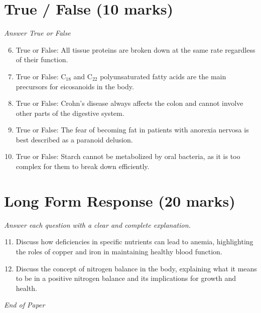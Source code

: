 \documentclass[12pt]{article}
\begin{document}
\section*{True / False (10 marks)}
\textit{Answer True or False}
\begin{enumerate}[label=\arabic*.]
\setcounter{enumi}{5}
\item True or False: All tissue proteins are broken down at the same rate regardless of their function.
\item True or False: C$_{18}$ and C$_{22}$ polyunsaturated fatty acids are the main precursors for eicosanoids in the body.
\item True or False: Crohn's disease always affects the colon and cannot involve other parts of the digestive system.
\item True or False: The fear of becoming fat in patients with anorexia nervosa is best described as a paranoid delusion.
\item True or False: Starch cannot be metabolized by oral bacteria, as it is too complex for them to break down efficiently.
\end{enumerate}

\section*{Long Form Response (20 marks)}
\textit{Answer each question with a clear and complete explanation.}
\begin{enumerate}[label=\arabic*.]
\setcounter{enumi}{10}
\item Discuss how deficiencies in specific nutrients can lead to anemia, highlighting the roles of copper and iron in maintaining healthy blood function.
\item Discuss the concept of nitrogen balance in the body, explaining what it means to be in a positive nitrogen balance and its implications for growth and health.
\end{enumerate}

\vfill
\noindent\textit{End of Paper}
\end{document}
